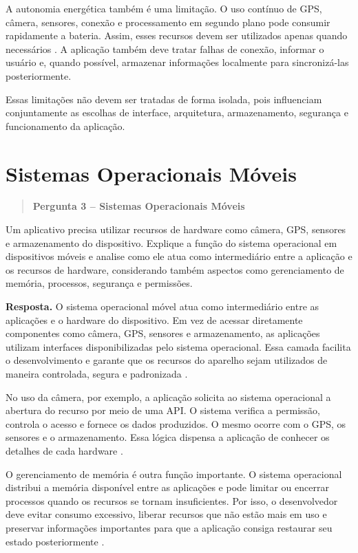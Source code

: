 \documentclass[
    12pt,
    oneside,
    a4paper,
    brazil
]{abntex2}
\newcommand{\pergunta}[2]{%
\begin{quote}
\noindent\textbf{Pergunta #1 -- #2}
\end{quote}}
\newcommand{\resposta}{%
\par\noindent\textbf{Resposta.}\hspace{0.3em}
}
\begin{document}
A autonomia energética também é uma limitação. O uso contínuo de GPS, câmera, sensores, conexão e processamento em segundo plano pode consumir rapidamente a bateria. Assim, esses recursos devem ser utilizados apenas quando necessários \cite{appleEnergy}. A aplicação também deve tratar falhas de conexão, informar o usuário e, quando possível, armazenar informações localmente para sincronizá-las posteriormente.

Essas limitações não devem ser tratadas de forma isolada, pois influenciam conjuntamente as escolhas de interface, arquitetura, armazenamento, segurança e funcionamento da aplicação.

\section{Sistemas Operacionais Móveis}
\pergunta{3}{Sistemas Operacionais Móveis}

Um aplicativo precisa utilizar recursos de hardware como câmera, GPS, sensores e armazenamento do dispositivo. Explique a função do sistema operacional em dispositivos móveis e analise como ele atua como intermediário entre a aplicação e os recursos de hardware, considerando também aspectos como gerenciamento de memória, processos, segurança e permissões.

\resposta O sistema operacional móvel atua como intermediário entre as aplicações e o hardware do dispositivo. Em vez de acessar diretamente componentes como câmera, GPS, sensores e armazenamento, as aplicações utilizam interfaces disponibilizadas pelo sistema operacional. Essa camada facilita o desenvolvimento e garante que os recursos do aparelho sejam utilizados de maneira controlada, segura e padronizada \cite{androidFundamentals}. 

No uso da câmera, por exemplo, a aplicação solicita ao sistema operacional a abertura do recurso por meio de uma API. O sistema verifica a permissão, controla o acesso e fornece os dados produzidos. O mesmo ocorre com o GPS, os sensores e o armazenamento. Essa lógica dispensa a aplicação de conhecer os detalhes de cada hardware \cite{androidPermissions,applePrivacy}. 

O gerenciamento de memória é outra função importante. O sistema operacional distribui a memória disponível entre as aplicações e pode limitar ou encerrar processos quando os recursos se tornam insuficientes. Por isso, o desenvolvedor deve evitar consumo excessivo, liberar recursos que não estão mais em uso e preservar informações importantes para que a aplicação consiga restaurar seu estado posteriormente \cite{androidMemory}. 
\end{document}
